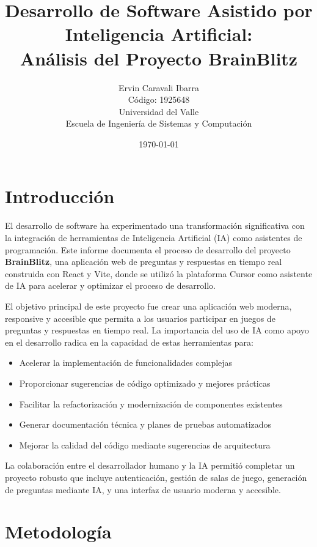 \documentclass[12pt,a4paper]{article}
\title{\textbf{Desarrollo de Software Asistido por Inteligencia Artificial:\\
Análisis del Proyecto BrainBlitz}}
\author{Ervin Caravali Ibarra\\
Código: 1925648\\
Universidad del Valle\\
Escuela de Ingeniería de Sistemas y Computación}
\date{\today}
\begin{document}
\maketitle

\newpage

\tableofcontents

\newpage

\section{Introducción}

El desarrollo de software ha experimentado una transformación significativa con la integración de herramientas de Inteligencia Artificial (IA) como asistentes de programación. Este informe documenta el proceso de desarrollo del proyecto \textbf{BrainBlitz}, una aplicación web de preguntas y respuestas en tiempo real construida con React y Vite, donde se utilizó la plataforma Cursor como asistente de IA para acelerar y optimizar el proceso de desarrollo.

El objetivo principal de este proyecto fue crear una aplicación web moderna, responsive y accesible que permita a los usuarios participar en juegos de preguntas y respuestas en tiempo real. La importancia del uso de IA como apoyo en el desarrollo radica en la capacidad de estas herramientas para:

\begin{itemize}
    \item Acelerar la implementación de funcionalidades complejas
    \item Proporcionar sugerencias de código optimizado y mejores prácticas
    \item Facilitar la refactorización y modernización de componentes existentes
    \item Generar documentación técnica y planes de pruebas automatizados
    \item Mejorar la calidad del código mediante sugerencias de arquitectura
\end{itemize}

La colaboración entre el desarrollador humano y la IA permitió completar un proyecto robusto que incluye autenticación, gestión de salas de juego, generación de preguntas mediante IA, y una interfaz de usuario moderna y accesible.

\section{Metodología}
\end{document}
